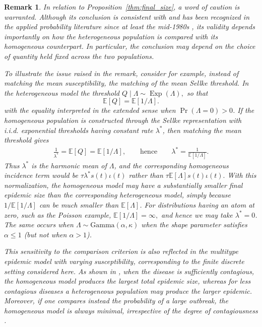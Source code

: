 \documentclass[pdflatex,sn-mathphys-ay]{sn-jnl}
\theoremstyle{thmstyleone}
\theoremstyle{thmstyletwo}
\theoremstyle{thmstylethree}
\newtheorem{remark}[theorem]{Remark}
\newcommand{\E}{\mathbb{E}}
\begin{document}
\begin{remark}
In relation to Proposition~\ref{thm:final_size}, a word of caution is warranted. Although its conclusion is consistent with \citet[Section~3]{Andersson1998heterogeneity} and has been recognized in the applied probability literature since at least the mid-1980s \citep{Ball1985detStoch}, its validity depends importantly on how the heterogeneous population is compared with its homogeneous counterpart.
In particular, the conclusion may depend on the choice of quantity held fixed across the two populations.

\vspace{.2in}

To illustrate the issue raised in the remark, consider 
for example, instead of matching the mean susceptibility, the matching of the mean Sellke threshold. In the heterogeneous model the threshold 
\(
Q \mid \Lambda \sim \operatorname{Exp}(\Lambda),
\)
so that
\[
\E[Q]=\E[1/\Lambda].
\]
with the equality interpreted in the extended sense when $\Pr(\Lambda=0)>0$. If the homogeneous population is constructed through the Sellke representation with i.i.d. exponential thresholds having constant rate $\lambda^\ast$, then matching the mean threshold gives
\begin{align*}
    \frac{1}{\lambda^\ast}
    = \E[Q]
    = \E[1/\Lambda],
    \qquad\text{hence}\qquad
    \lambda^\ast
    = \frac{1}{\E[1/\Lambda]}.
\end{align*}
Thus $\lambda^\ast$ is the harmonic mean of $\Lambda$, and the corresponding homogeneous incidence term would be
\(
\tau \lambda^\ast s(t)\iota(t)
\)
rather than
\(
\tau \E[\Lambda] s(t)\iota(t).
\)
With this normalization, the homogeneous model may have a substantially smaller final epidemic size than the corresponding heterogeneous model, simply because
\(
1/{\E[1/\Lambda]}
\)
can be much smaller than $\E[\Lambda]$. For distributions having an atom at zero, such as the Poisson example,
\(
\E\!\left[1/{\Lambda}\right]=\infty,
\)
and hence we may take \(\lambda^*=0\). The same occurs when 
\(\Lambda\sim\mathrm{Gamma}(\alpha,\kappa)\) when the shape parameter satisfies
\(\alpha\leq 1\) (but not when  \(\alpha>1\)). 


This sensitivity to the comparison criterion is also reflected in the multitype epidemic model with varying susceptibility, corresponding to the finite discrete setting considered here. As shown in \citet[Observation~1]{Andersson1998heterogeneity}, when the disease is sufficiently contagious, the homogeneous model produces the largest total epidemic size, whereas for less contagious diseases a heterogeneous population may produce the larger epidemic. Moreover, if one compares instead the probability of a large outbreak, the homogeneous model is always minimal, irrespective of the degree of contagiousness \cite[p.~656]{Andersson1998heterogeneity}.


\end{remark}
\end{document}
